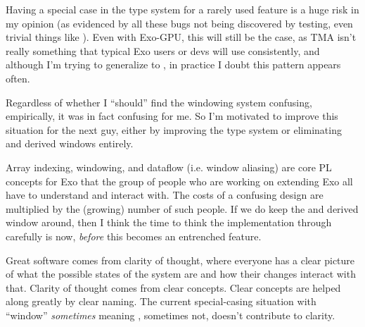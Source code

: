 \filbreak
{} Having a special case in the type system for a rarely used feature is a huge risk in my opinion (as evidenced by all these bugs not being discovered by testing, even trivial things like ).
Even with Exo-GPU, this will still be the case, as TMA isn't really something that typical Exo users or devs will use consistently, and although I'm trying to generalize  to , in practice I doubt this pattern appears often.

\filbreak
Regardless of whether I ``should'' find the windowing system confusing, empirically, it was in fact confusing for me.
So I'm motivated to improve this situation for the next guy, either by improving the type system or eliminating  and derived windows entirely.

\filbreak
Array indexing, windowing, and dataflow (i.e. window aliasing) are core PL concepts for Exo that the group of people who are working on extending Exo all have to understand and interact with.
The costs of a confusing design are multiplied by the (growing) number of such people.
If we do keep the  and derived window around, then I think the time to think the implementation through carefully is now, \textit{before} this becomes an entrenched feature.

\filbreak
Great software comes from clarity of thought, where everyone has a clear picture of what the possible states of the system are and how their changes interact with that.
Clarity of thought comes from clear concepts.
Clear concepts are helped along greatly by clear naming.
The current special-casing situation with ``window'' \textit{sometimes} meaning , sometimes not, doesn't contribute to clarity.


